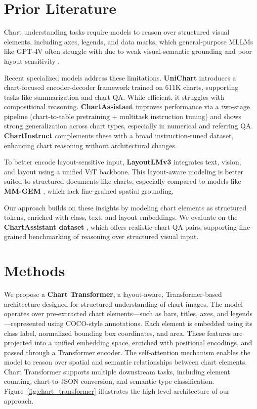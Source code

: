 \documentclass[11pt]{article}
\begin{document}
\section{Prior Literature}

Chart understanding tasks require models to reason over structured visual elements, including axes, legends, and data marks, which general-purpose MLLMs like GPT-4V often struggle with due to weak visual-semantic grounding and poor layout sensitivity \cite{li2024visualizationliteracy, huang2024survey}.

Recent specialized models address these limitations. \textbf{UniChart} \cite{masry2023unichart} introduces a chart-focused encoder-decoder framework trained on 611K charts, supporting tasks like summarization and chart QA. While efficient, it struggles with compositional reasoning. \textbf{ChartAssistant} \cite{zhang2024chartassistant} improves performance via a two-stage pipeline (chart-to-table pretraining + multitask instruction tuning) and shows strong generalization across chart types, especially in numerical and referring QA. \textbf{ChartInstruct} \cite{lin2024chartinstruct} complements these with a broad instruction-tuned dataset, enhancing chart reasoning without architectural changes.

To better encode layout-sensitive input, \textbf{LayoutLMv3} \cite{huang2023layoutlmv3} integrates text, vision, and layout using a unified ViT backbone. This layout-aware modeling is better suited to structured documents like charts, especially compared to models like \textbf{MM-GEM} \cite{zhang2024mmgem}, which lack fine-grained spatial grounding.

Our approach builds on these insights by modeling chart elements as structured tokens, enriched with class, text, and layout embeddings. We evaluate on the \textbf{ChartAssistant dataset} \cite{chartassistant_dataset}, which offers realistic chart-QA pairs, supporting fine-grained benchmarking of reasoning over structured visual input.



\section{Methods}

We propose a \textbf{Chart Transformer}, a layout-aware, Transformer-based architecture designed for structured understanding of chart images. The model operates over pre-extracted chart elements—such as bars, titles, axes, and legends—represented using COCO-style annotations. Each element is embedded using its class label, normalized bounding box coordinates, and area. These features are projected into a unified embedding space, enriched with positional encodings, and passed through a Transformer encoder. The self-attention mechanism enables the model to reason over spatial and semantic relationships between chart elements. Chart Transformer supports multiple downstream tasks, including element counting, chart-to-JSON conversion, and semantic type classification. Figure~\ref{fig:chart_transformer} illustrates the high-level architecture of our approach.
\end{document}
